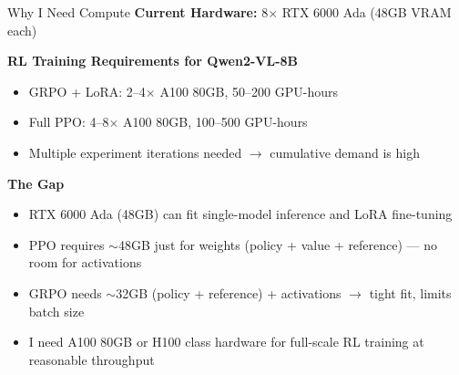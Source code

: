 \documentclass[10pt, aspectratio=169]{beamer}
\begin{document}
\begin{frame}{Why I Need Compute}
  \textbf{Current Hardware:} 8$\times$ RTX 6000 Ada (48GB VRAM each)

  \vspace{0.3em}
  \textbf{RL Training Requirements for Qwen2-VL-8B}
  \begin{itemize}
    \item GRPO + LoRA: 2--4$\times$ A100 80GB, 50--200 GPU-hours
    \item Full PPO: 4--8$\times$ A100 80GB, 100--500 GPU-hours
    \item Multiple experiment iterations needed $\rightarrow$ cumulative demand is high
  \end{itemize}

  \vspace{0.3em}
  \textbf{The Gap}
  \begin{itemize}
    \item RTX 6000 Ada (48GB) can fit single-model inference and LoRA fine-tuning
    \item PPO requires $\sim$48GB just for weights (policy + value + reference) --- no room for activations
    \item GRPO needs $\sim$32GB (policy + reference) + activations $\rightarrow$ tight fit, limits batch size
    \item I need A100 80GB or H100 class hardware for full-scale RL training at reasonable throughput
  \end{itemize}
\end{frame}
\end{document}
